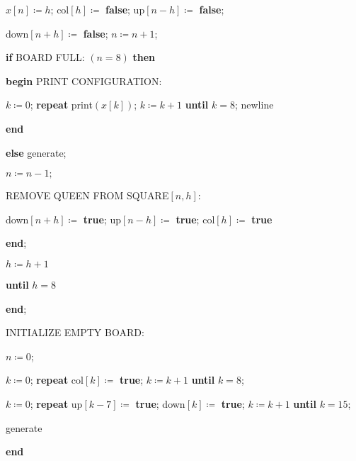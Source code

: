\noindent
\quad \quad \quad \quad \quad $x[n] \coloneq h$; col$[h]\coloneq$ \textbf{false}; up$[n-h]\coloneq$ \textbf{false};

\noindent
\quad \quad \quad \quad \quad down$[n+h]\coloneq$ \textbf{false}; $n\coloneq n + 1$;

\noindent
\quad \quad \quad \quad \textbf{if} BOARD FULL: $(n = 8)$ \textbf{then}

\noindent
\quad \quad \quad \quad \textbf{begin} PRINT CONFIGURATION:

\noindent
\quad \quad \quad \quad \quad $k\coloneq 0$; \textbf{repeat} print$(x[k])$; $k\coloneq k + 1$ \textbf{until} $k = 8$; newline


\noindent
\quad \quad \quad \quad \textbf{end}

\noindent
\quad \quad \quad \textbf{else} generate;

\noindent
\quad \quad \quad \quad $n \coloneq n - 1;$

\noindent
\quad \quad \quad \quad  REMOVE QUEEN FROM SQUARE$[n,h]$:

\noindent
\quad \quad \quad \quad \quad down$[n+h]\coloneq$ \textbf{true}; up$[n-h] \coloneq$ \textbf{true}; col$[h]\coloneq$ \textbf{true}

\noindent
\quad \quad \quad \textbf{end};

\noindent
\quad \quad \quad $h\coloneq h + 1$

\noindent
\quad \quad \textbf{until} $h = 8$

\noindent
\quad \textbf{end};

\noindent
\quad INITIALIZE EMPTY BOARD:

\noindent
\quad \quad $n \coloneq 0$;

\noindent
\quad \quad $k\coloneq 0$; \textbf{repeat} col$[k] \coloneq$ \textbf{true}; $k\coloneq k + 1$ \textbf{until} $k = 8$;

\noindent
\quad \quad $k\coloneq 0$; \textbf{repeat} up$[k-7] \coloneq$ \textbf{true}; down$[k] \coloneq$ \textbf{\textbf{true}}; $k\coloneq k + 1$ \textbf{until} $k=15$;

\noindent
\quad generate

\noindent
\textbf{end}
